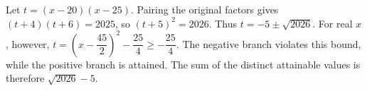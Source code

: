Let $t=(x-20)(x-25)$. Pairing the original factors gives $(t+4)(t+6)=2025$, so $(t+5)^2=2026$. Thus $t=-5\pm\sqrt{2026}$. For real $x$, however, $t=(x-\dfrac{45}{2})^2-\dfrac{25}{4}\ge-\dfrac{25}{4}$. The negative branch violates this bound, while the positive branch is attained. The sum of the distinct attainable values is therefore $\boxed{\sqrt{2026}-5}$.
